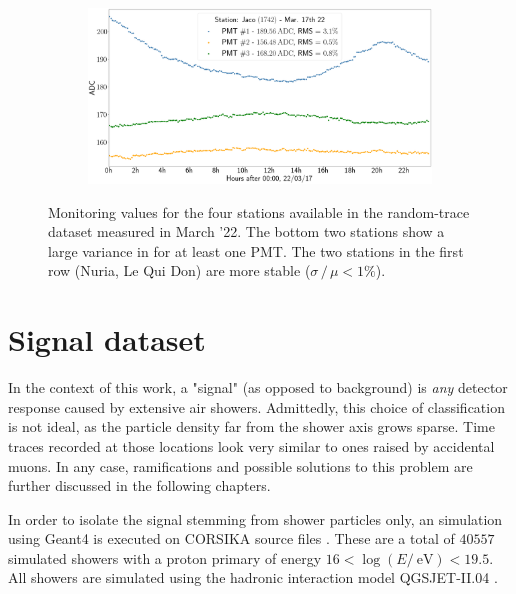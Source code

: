 \begin{landscape}
\begin{figure}
\begin{subfigure}[b]{0.5\textwidth}
        \end{subfigure}
        \begin{subfigure}[b]{0.5\textwidth}   
            \centering 
            \includegraphics[width=0.7\textheight]{./plots/random_trace_diagnostics_jaco.png}
        \end{subfigure}
        \caption{Monitoring values for the four stations available in the random-trace dataset measured in March '22. The bottom two stations show a large variance
		in \Ipeak for at least one PMT. The two stations in the first row (Nuria, Le Qui Don) are more stable ($\sigma\,/\,\mu < 1\%$).} 
        \label{fig:random-trace-diagnostics}
    \end{figure}
\end{landscape}

\section{Signal dataset}
\label{sec:signal-dataset}

In the context of this work, a "signal" (as opposed to background) is \textit{any} detector response caused by extensive air showers. Admittedly, this choice of 
classification is not ideal, as the particle density far from the shower axis grows sparse. Time traces recorded at those locations look very similar to ones 
raised by accidental muons. In any case, ramifications and possible solutions to this problem are further discussed in the following chapters. 

In order to isolate the signal stemming from shower particles only, an \Offline simulation using Geant4 is executed on CORSIKA source files \cite{heck1998corsika}.
These are a total of $40557$ simulated showers with a proton primary of energy $16 < \log\left(E/\SI{}{\electronvolt}\right) < 19.5$.  All showers are simulated 
using the hadronic interaction model QGSJET-II.04 \cite{ostapchenko2007status}.

